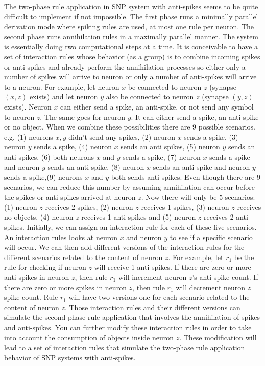 \documentclass[a4paper]{article}
\theoremstyle{definition}
\begin{document}
The two-phase rule application in SNP system with anti-spikes seems to be quite difficult to implement
if not impossible. The first phase runs a minimally parallel derivation mode where spiking rules are
used, at most one rule per neuron. The second phase runs annihilation rules in a maximally parallel 
manner. The system is essentially doing two computational steps at a time. It is conceivable to have
a set of interaction rules whose behavior (as a group) is to combine incoming spikes or anti-spikes
and already perform the annihilation processes so either only a number of spikes will arrive to
neuron or only a number of anti-spikes will arrive to a neuron. For example, let neuron $x$ be 
connected to neuron $z$ (synapse $(x,z)$ exists) and let neuron $y$ also be connected to neuron $z$
(synapse $(y,z)$ exists). Neuron $x$ can either send a spike, an anti-spike, or not send any symbol
to neuron $z$. The same goes for neuron $y$. It can either send a spike, an anti-spike or no 
object. When we combine these possibilities there are $9$ possible scenarios. e.g. (1) neurons $x,y$
didn't send any spikes, (2) neuron $x$ sends a spike, (3) neuron $y$ sends a spike, (4) neuron $x$
 sends an anti spikes, (5) neuron $y$ sends an anti-spikes, (6) both neurons $x$ and $y$ sends a
spike, (7) neuron $x$ sends a spike and neuron $y$ sends an anti-spike, (8) neuron $x$ sends an
anti-spike and neuron $y$ sends a spike,(9) neurons $x$ and $y$ both sends anti-spikes. Even though
there are 9 scenarios, we can reduce this number by assuming annihilation can occur before the
spikes or anti-spikes arrived at neuron $z$. Now there will only be $5$ scenarios: (1) neuron $z$
receives 2 spikes, (2) neuron $z$ receives 1 spikes, (3) neuron $z$ receives no objects, (4) neuron
$z$ receives 1 anti-spikes and (5) neuron $z$ receives 2 anti-spikes. Initially, we can assign 
an interaction rule for each of these five scenarios. An interaction rules looks at neuron $x$
and neuron $y$ to see if a specific scenario will occur. We can then add different versions of
the interaction rules for the different scenarios related to the content of neuron $z$. For example,
let $r_1$ be the rule for checking if neuron $z$ will receive 1 anti-spikes. If there are zero or
more anti-spikes in neuron $z$, then rule $r_1$ will increment neuron $z$'s anti-spike count. If 
there are zero or more spikes in neuron $z$, then rule $r_1$ will decrement neuron $z$ spike count.
Rule $r_1$ will have two versions one for each scenario related to the content of neuron $z$. Those
interaction rules and their different versions can simulate the second phase rule application that
involves the annihilation of spikes and anti-spikes. You can further modify these interaction rules
in order to take into account the consumption of objects inside neuron $z$. These modification will
lead to a set of interaction rules that simulate the two-phase rule application behavior of SNP 
systems with anti-spikes.
\end{document}
